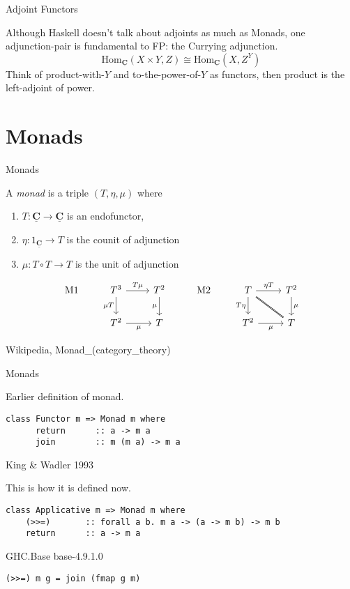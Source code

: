 \documentclass[10pt]{beamer}
\newcommand{\Cat}[1]{\ensuremath{\underline{\mathbf{#1}}}}
\newcommand{\Hom}[3]{\ensuremath{\mathrm{Hom}_{\Cat{#1}}(#2,#3)}}
\theoremstyle{definition}
\theoremstyle{remark}
\numberwithin{equation}{section}
\begin{document}
\begin{frame}[fragile]{Adjoint Functors}

  Although Haskell doesn't talk about adjoints as much as Monads, one adjunction-pair is fundamental to FP: the Currying adjunction.
  \[
  \Hom{C}{X\times Y}{Z} \cong \Hom{C}{X}{Z^Y}
  \]
  Think of product-with-$Y$ and to-the-power-of-$Y$ as functors, then product is the left-adjoint of power.
  
\end{frame}

\section{Monads}

\begin{frame}[fragile]{Monads}

  A \emph{monad} is a triple $(T,\eta,\mu)$ where
  \begin{enumerate}
  \item $T: \Cat{C}\to \Cat{C}$ is an endofunctor,
  \item $\eta: 1_{\Cat{C}} \to T$ is the counit of adjunction
  \item $\mu: T \circ T \rightarrow T$ is the unit of adjunction
  \end{enumerate}

  \[
  \begin{tikzcd}
    \mathrm{M1} & T^3 \arrow{d}[swap]{\mu T}\arrow{r}{T\mu}  & T^2 \arrow{d}[swap]{\mu} &
    \mathrm{M2} & T \arrow{d}[swap]{T\eta}\arrow{r}{\eta T}\arrow[dash,double]{dr} & T^2 \arrow{d}{\mu} \\
    & T^2 \arrow{r}[swap]{\mu} & T & & T^2 \arrow{r}[swap]{\mu} & T
  \end{tikzcd}
  \]

  {\small Wikipedia, Monad\_(category\_theory)}
  
\end{frame}

\begin{frame}[fragile]{Monads}

  Earlier definition of monad.
  
  \begin{lstlisting}[frame=single]
    class Functor m => Monad m where
      return      :: a -> m a
      join        :: m (m a) -> m a
  \end{lstlisting}

  {\small King \& Wadler 1993}

  This is how it is defined now.
  
  \begin{lstlisting}[frame=single]
    class Applicative m => Monad m where
    (>>=)       :: forall a b. m a -> (a -> m b) -> m b
    return      :: a -> m a
  \end{lstlisting}

  {\small GHC.Base base-4.9.1.0}

  \begin{lstlisting}[frame=single]
    (>>=) m g = join (fmap g m)
  \end{lstlisting}

\end{frame}
\end{document}

